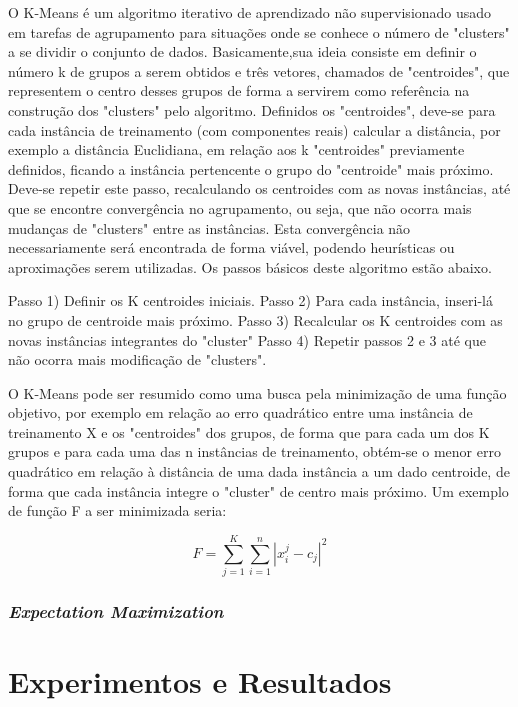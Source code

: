 \documentclass{article}
\begin{document}
O K-Means é um algoritmo iterativo de aprendizado não supervisionado usado em tarefas de agrupamento para situações onde se conhece o número de "clusters" a se dividir o conjunto de dados. Basicamente,sua ideia consiste em definir o número k de grupos a serem obtidos e três vetores, chamados de "centroides", que representem o centro desses grupos de forma a servirem como referência na construção dos "clusters" pelo algoritmo. Definidos os "centroides", deve-se para cada instância de treinamento (com componentes reais) calcular a distância, por exemplo a distância Euclidiana, em relação aos k "centroides" previamente definidos, ficando a instância pertencente o grupo do "centroide" mais próximo. Deve-se repetir este passo, recalculando os centroides com as novas instâncias, até que se encontre convergência no agrupamento, ou seja, que não ocorra mais mudanças de "clusters" entre as instâncias. Esta convergência não necessariamente será encontrada de forma viável, podendo heurísticas ou aproximações serem utilizadas. Os passos básicos deste algoritmo estão abaixo.

	Passo 1) Definir os K centroides iniciais.
	Passo 2) Para cada instância, inseri-lá no grupo de centroide mais próximo.
	Passo 3) Recalcular os K centroides com as novas instâncias integrantes do "cluster"
	Passo 4) Repetir passos 2 e 3 até que não ocorra mais modificação de "clusters".

O K-Means pode ser resumido como uma busca pela minimização de uma função objetivo, por exemplo em relação ao erro quadrático entre uma instância de treinamento X e os "centroides" dos grupos, de forma que para cada um dos K grupos e para cada uma das n instâncias de treinamento, obtém-se o menor erro quadrático em relação à distância de uma dada instância a um dado centroide, de forma que cada instância integre o "cluster" de centro mais próximo. Um exemplo de função F a ser minimizada seria:

\begin{equation}
F = \sum_{j=1}^{K} \sum_{i=1}^{n} {|{x}_{i}^{j} - c_{j}|}^2
\end{equation}

\subsubsection{{\b \it Expectation Maximization}}

\section{Experimentos e Resultados}
\end{document}
